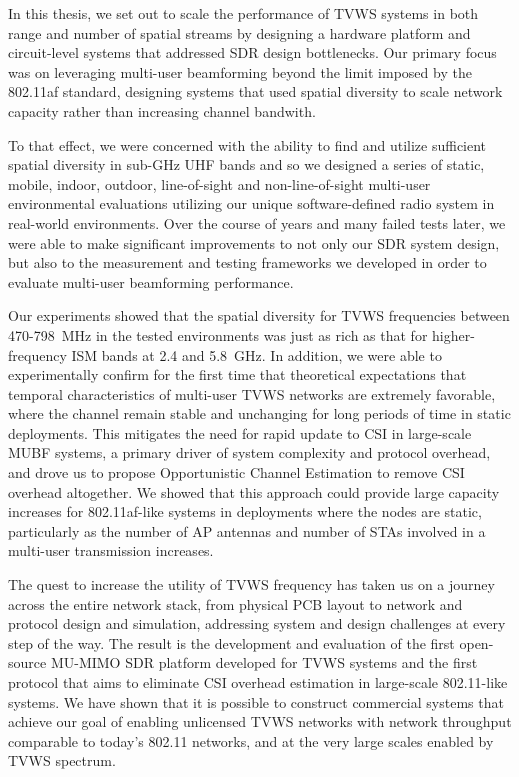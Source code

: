 
	In this thesis, we set out to scale the performance of \ac{TVWS} systems in both range and number of spatial streams by designing a hardware platform and circuit-level systems that addressed \ac{SDR} design bottlenecks.
	Our primary focus was on leveraging multi-user beamforming beyond the limit imposed by the 802.11af standard, designing systems that used spatial diversity to scale network capacity rather than increasing channel bandwith.
	
	To that effect, we were concerned with the ability to find and utilize sufficient spatial diversity in sub-GHz UHF bands and so we designed a series of static, mobile, indoor, outdoor, line-of-sight and non-line-of-sight multi-user environmental evaluations utilizing our unique software-defined radio system in real-world environments.
	Over the course of years and many failed tests later, we were able to make significant improvements to not only our \ac{SDR} system design, but also to the measurement and testing frameworks we developed in order to evaluate multi-user beamforming performance.
	
	Our experiments showed that the spatial diversity for \ac{TVWS} frequencies between 470-798~MHz in the tested environments was just as rich as that for higher-frequency \ac{ISM} bands at 2.4 and 5.8~GHz.
	In addition, we were able to experimentally confirm for the first time that theoretical expectations that temporal characteristics of multi-user \ac{TVWS} networks are extremely favorable, where the channel remain stable and unchanging for long periods of time in static deployments.
	This mitigates the need for rapid update to \ac{CSI} in large-scale \ac{MUBF} systems, a primary driver of system complexity and protocol overhead, and drove us to propose Opportunistic Channel Estimation to remove \ac{CSI} overhead altogether.
	We showed that this approach could provide large capacity increases for 802.11af-like systems in deployments where the nodes are static, particularly as the number of \ac{AP} antennas and number of \acp{STA} involved in a multi-user transmission increases.
	

	The quest to increase the utility of \ac{TVWS} frequency has taken us on a journey across the entire network stack, from physical \ac{PCB} layout to network and protocol design and simulation, addressing system and design challenges at every step of the way.
	The result is the development and evaluation of the first open-source \ac{MU-MIMO} \ac{SDR} platform developed for \ac{TVWS} systems and the first protocol that aims to eliminate \ac{CSI} overhead estimation in large-scale 802.11-like systems.
	We have shown that it is possible to construct commercial systems that achieve our goal of enabling unlicensed \ac{TVWS} networks with network throughput comparable to today's 802.11 networks, and at the very large scales enabled by \ac{TVWS} spectrum.


